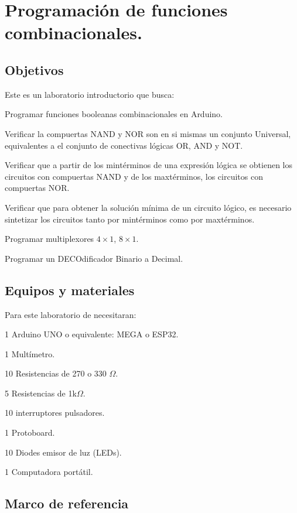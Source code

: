 \chapter{Programación de funciones combinacionales.}

\section{Objetivos}
Este es un laboratorio introductorio que busca:
\begin{itemize}
	{\small
	 \item  Programar funciones booleanas combinacionales en Arduino.
	 \item  Verificar la compuertas NAND y NOR son en si mismas un conjunto Universal, equivalentes a el conjunto de conectivas lógicas OR, AND y NOT.
	\item  	Verificar que a partir de los mintérminos de una expresión lógica se obtienen los circuitos con compuertas NAND y de los maxtérminos, los circuitos con compuertas NOR.
	\item  Verificar que para obtener la solución mínima de un circuito lógico, es necesario sintetizar los circuitos tanto por mintérminos como por maxtérminos. 
	\item Programar multiplexores $4\times1$, $8\times1$.
	\item Programar un DECOdificador Binario a Decimal.
 }
\end{itemize} 


\section{Equipos y materiales}
Para este laboratorio de necesitaran:
\begin{itemize} 
	{\small \item 1 Arduino UNO o equivalente: MEGA o ESP32.
	\item 1 Multímetro.
	\item 10 Resistencias de 270 o 330 $\Omega$.
	\item 5 Resistencias de 1k$\Omega$.
	\item 10 interruptores pulsadores.
	\item 1 Protoboard.
	\item 10 Diodes emisor de luz (LEDs).
	\item 1 Computadora portátil.}
\end{itemize}

\section{Marco de referencia}

